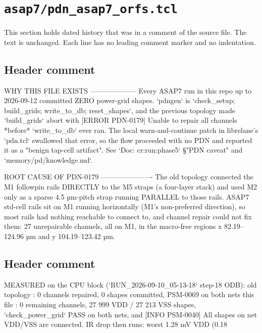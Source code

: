 \section{\texttt{asap7/pdn\_asap7\_orfs.tcl}}\label{cr:pd:asap7-pdn-orfs-tcl}

This section holds dated history that was in a comment of the source file. The text is unchanged. Each line has no leading comment marker and no indentation.

\begin{record}

\subsection*{Header comment}

\begin{textblock}
WHY THIS FILE EXISTS
--------------------
Every ASAP7 run in this repo up to 2026-09-12 committed ZERO power-grid
shapes.  `pdngen` is `check_setup; build_grids; write_to_db; reset_shapes`,
and the previous topology made `build_grids` abort with
  [ERROR PDN-0179] Unable to repair all channels
*before* `write_to_db` ever ran.  The local warn-and-continue patch in
librelane's `pdn.tcl` swallowed that error, so the flow proceeded with no PDN
and reported it as a "benign tap-cell artifact".  See
`Doc: cr:run:phase5` §"PDN caveat" and `memory/pd/knowledge.md`.

ROOT CAUSE OF PDN-0179
----------------------
The old topology connected the M1 followpin rails DIRECTLY to the M5 straps
(a four-layer stack) and used M2 only as a sparse 4.5 µm-pitch strap running
PARALLEL to those rails.  ASAP7 std-cell rails sit on M1 running horizontally
(M1's non-preferred direction), so most rails had nothing reachable to
connect to, and channel repair could not fix them: 27 unrepairable channels,
all on M1, in the macro-free regions x 82.19–124.96 µm and y 104.19–123.42 µm.

\end{textblock}

\subsection*{Header comment}

\begin{textblock}

MEASURED on the CPU block (`RUN_2026-09-10_05-13-18` step-18 ODB):
  old topology : 0 channels repaired, 0 shapes committed, PSM-0069 on both nets
  this file    : 0 remaining channels, 27 999 VDD / 27 213 VSS shapes,
                 `check_power_grid` PASS on both nets, and
                 [INFO PSM-0040] All shapes on net VDD/VSS are connected.
  IR drop then runs: worst 1.28 mV VDD (0.18 %

\end{textblock}

\end{record}

